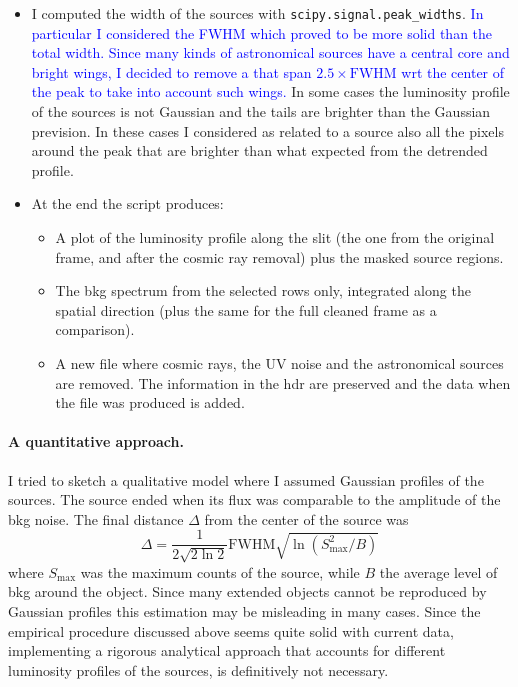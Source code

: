 \documentclass{article}
\newcommand{\arbitrario}[1]{\textcolor{blue}{#1}}
\begin{document}
\begin{itemize}
	\item I computed the width of the sources with \texttt{scipy.signal.peak\_widths}. \arbitrario{In particular I considered the FWHM which proved to be more solid than the total width. Since many kinds of astronomical sources have a central core and bright wings, I decided to remove a that span $2.5\times\text{FWHM}$ wrt the center of the peak to take into account such wings.}	
	In some cases the luminosity profile of the sources is not Gaussian and the tails are brighter than the Gaussian prevision. In these cases I considered as related to a source also all the pixels around the peak that are brighter than what expected from the detrended profile.
	
	\item At the end the script produces:
	\begin{itemize}
		\item A plot of the luminosity profile along the slit (the one from the original frame, and after the cosmic ray removal) plus the masked source regions.
		\item The bkg spectrum from the selected rows only, integrated along the spatial direction (plus the same for the full cleaned frame as a comparison).
		\item A new file where cosmic rays, the UV noise and the astronomical sources are removed. The information in the hdr are preserved and the data when the file was produced is added.
	\end{itemize}
\end{itemize}


\paragraph{A quantitative approach.} I tried to sketch a qualitative model where I assumed Gaussian profiles of the sources. The source ended when its flux was comparable to the amplitude of the bkg noise. The final distance $\Delta$ from the center of the source was
\[\Delta = \frac{1}{2\sqrt{2\ln 2}}\text{FWHM}\sqrt{\ln(S_\text{max}^2/B)}   \]
where $S_\text{max}$ was the maximum counts of the source, while $B$ the average level of bkg around the object. Since many extended objects cannot be reproduced by Gaussian profiles this estimation may be misleading in many cases. Since the empirical procedure discussed above seems quite solid with current data, implementing a rigorous analytical approach that accounts for different luminosity profiles of the sources, is definitively not necessary.
\end{document}
